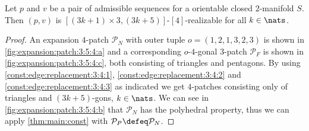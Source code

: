 \clearpage
\begin{theorem}
  Let $p$ and $v$ be a pair of admissible sequences for a orientable closed $2$-manifold $S$. Then $(p, v)$ is $[(3k + 1) \times 3, (3k+5)]$-$[4]$-realizable for all $k \in \nats$.
  \begin{proof}
    An expansion $4$-patch $\mathcal{P}_N$ with outer tuple $o = (1, 2, 1, 3, 2, 3)$ is shown in \autoref{fig:expansion:patch:3:5:4:a} and a corresponding $o$-$4$-gonal $3$-patch $\mathcal{P}_F$ is shown in \autoref{fig:expansion:patch:3:5:4:c}, both consisting of triangles and pentagons. By using \autoref{const:edge:replacement:3:4:1}, \autoref{const:edge:replacement:3:4:2} and \autoref{const:edge:replacement:3:4:3} as indicated we get $4$-patches consisting only of triangles and $(3k+5)$-gons, $k \in \nats$. We can see in \autoref{fig:expansion:patch:3:5:4:b} that $\mathcal{P}_N$ has the polyhedral property, thus we can apply \autoref{thm:main:const} with $\mathcal{P}_P \defeq \mathcal{P}_N$.
  \end{proof}
\end{theorem}
